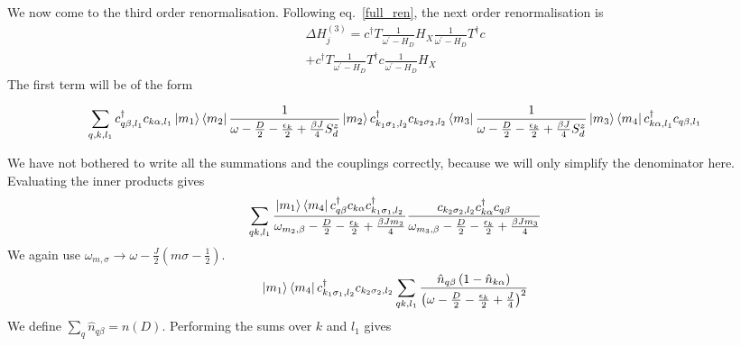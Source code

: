\documentclass[reprint,prb,superscriptaddress]{revtex4-2}
\begin{document}
We now come to the third order renormalisation.
Following eq.~\ref{full_ren}, the next order renormalisation is
\begin{equation}\begin{aligned}
	\label{psector_3rd_ren}
	\Delta H^{(3)}_j = c^\dagger T \frac{1}{\omega^\prime - H_D} H_X \frac{1}{\omega^\prime - H_D} T^\dagger c \\
	+ c^\dagger T \frac{1}{\omega^\prime - H_D} T^\dagger c \frac{1}{\omega^\prime - H_D} H_X
\end{aligned}\end{equation}
The first term will be of the form
\begin{widetext}
\begin{equation}\begin{aligned}
	\sum_{q,k,l_1} c^\dagger_{q\beta, l_1}c_{k \alpha, l_1}\ket{m_1}\bra{m_2} \frac{1}{\omega - \frac{D}{2} - \frac{\epsilon_k}{2} + \frac{\beta J}{4}S_d^z} \ket{m_2} c^\dagger_{k_1 \sigma_1, l_2}c_{k_2 \sigma_2,l_2} \bra{m_3}\frac{1}{\omega - \frac{D}{2} - \frac{\epsilon_k}{2} + \frac{\beta J}{4}S_d^z}\ket{m_3}\bra{m_4}c^\dagger_{k\alpha, l_1}c_{q\beta, l_1}
\end{aligned}\end{equation}
\end{widetext}
We have not bothered to write all the summations and the couplings correctly, because we will only simplify the denominator here. Evaluating the inner products gives
\begin{equation}\begin{aligned}
	\sum_{qk,l_1} \frac{\ket{m_1}\bra{m_4}c^\dagger_{q\beta}c_{k \alpha}c^\dagger_{k_1 \sigma_1, l_2}}{\omega_{m_2,\beta} - \frac{D}{2} - \frac{\epsilon_k}{2} + \frac{\beta J m_2}{4}}  \frac{c_{k_2 \sigma_2,l_2}c^\dagger_{k\alpha}c_{q\beta}}{\omega_{m_3,\beta} - \frac{D}{2} - \frac{\epsilon_k}{2} + \frac{\beta J m_3}{4}}
\end{aligned}\end{equation}
We again use \(\omega_{m,\sigma} \to \omega - \frac{J}{2}\left(m\sigma - \frac{1}{2}\right)\).
\begin{equation}\begin{aligned}
	\ket{m_1}\bra{m_4}c^\dagger_{k_1 \sigma_1, l_2}c_{k_2 \sigma_2,l_2}\sum_{qk,l_1} \frac{\hat n_{q\beta}\left(1 - \hat n_{k\alpha}\right)}{\left(\omega - \frac{D}{2} - \frac{\epsilon_k}{2} + \frac{J}{4}\right)^2}
\end{aligned}\end{equation}
We define \(\sum_q \hat n_{q\beta} = n(D)\). Performing the sums over \(k\) and \(l_1\) gives
\end{document}
